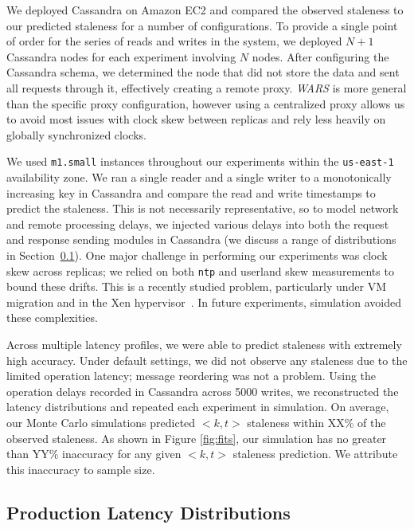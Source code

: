 \documentclass{vldb}
\begin{document}
We deployed Cassandra on Amazon EC2 and compared the observed
staleness to our predicted staleness for a number of configurations.
To provide a single point of order for the series of reads and writes
in the system, we deployed $N+1$ Cassandra nodes for each experiment
involving $N$ nodes.  After configuring the Cassandra schema, we
determined the node that did not store the data and sent all requests
through it, effectively creating a remote proxy.  \textit{WARS}  is more
general than the specific proxy configuration, however using a
centralized proxy allows us to avoid most issues with clock skew
between replicas and rely less heavily on globally synchronized
clocks.

We used \texttt{m1.small} instances throughout our experiments within
the \texttt{us-east-1} availability zone.  We ran a single reader and
a single writer to a monotonically increasing key in Cassandra and
compare the read and write timestamps to predict the staleness.  This
is not necessarily representative, so to model network and remote
processing delays, we injected various delays into both the request
and response sending modules in Cassandra (we discuss a range of
distributions in Section~\ref{sec:latencies}).  One major challenge in
performing our experiments was clock skew across replicas; we relied
on both \texttt{ntp} and userland skew measurements to bound these
drifts.  This is a recently studied problem, particularly under VM
migration and in the Xen hypervisor~\cite{time-virt}. In future
experiments, simulation avoided these complexities.

Across multiple latency profiles, we were able to predict staleness
with extremely high accuracy. Under default settings, we did not
observe any staleness due to the limited operation latency; message
reordering was not a problem.  Using the operation delays recorded in
Cassandra across 5000 writes, we reconstructed the latency
distributions and repeated each experiment in simulation.  On average,
our Monte Carlo simulations predicted $<k,t>$ staleness within XX\% of
the observed staleness.  As shown in Figure \ref{fig:fits}, our
simulation has no greater than YY\% inaccuracy for any given $<k,t>$
staleness prediction.  We attribute this inaccuracy to sample size.


\subsection{Production Latency Distributions}
\label{sec:latencies}
\end{document}
